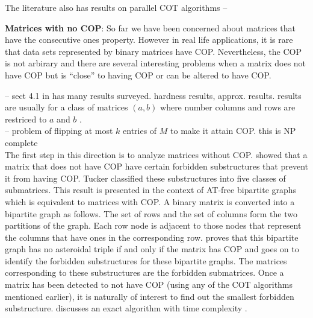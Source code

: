 \documentclass[MS,]{iitmdiss}
\begin{document}
The literature also has results on parallel COT algorithms --
\cite{as95} \cite{bs03} 
\cite{ly91}



{\bf Matrices with no COP}: So far we have been concerned about matrices that have the consecutive
ones property. However in real life applications, it is rare that data
sets represented by binary matrices have COP. Nevertheless, the COP is
not arbirary and there are several interesting problems when a matrix
does not have COP but is ``close'' to having COP or can be altered to
have COP. 





-- sect 4.1 in \cite{d08phd} has many results surveyed. hardness results,
approx. results. results are usually for a class of matrices $(a,b)$
where number columns and rows are restriced to $a$ and $b$
.\\
-- problem of flipping at most $k$ entries of $M$ to make it attain
COP. this is NP complete \cite{b75-phd}\\






The first step in this direction is to analyze matrices without
COP. \cite{at72} showed that a matrix that does not have COP have
certain forbidden substructures that prevent it from having
COP. Tucker classified these substructures into five classes of
submatrices. This result is presented in the context of AT-free
bipartite graphs  which
is equivalent to matrices with COP. A binary matrix is converted into
a bipartite graph as follows. The set of rows and the set of columns
form the two partitions of the graph. Each row node is adjacent to
those nodes that represent the columns that have ones in the
corresponding row. \cite{at72} proves that this bipartite graph has no
asteroidal triple if and only if the matrix has COP and goes on to
identify the forbidden substructures for these bipartite graphs. The
matrices corresponding to these substructures are the forbidden
submatrices. Once a matrix has been detected to not have COP (using
any of the COT algorithms mentioned earlier), it is naturally of
interest to find out the smallest
forbidden substructure. \cite{d08phd} discusses an exact algorithm
with time complexity .  
\end{document}
